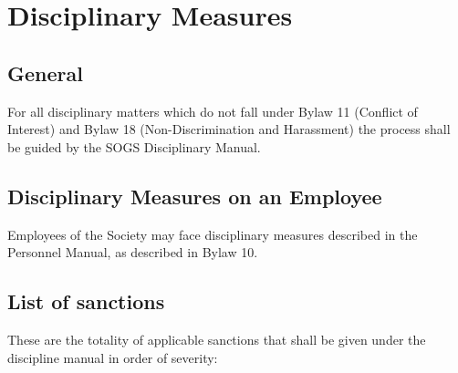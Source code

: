 \section{Disciplinary Measures}
\subsection {General}
\begin{longenum}[ label*=\thesubsection.\arabic*., align=left] 
\item For all disciplinary matters which do not fall under Bylaw 11 (Conflict of Interest) and Bylaw 18 (Non-Discrimination and Harassment) the process shall be guided by the SOGS Disciplinary Manual.
\end{longenum}
\subsection {Disciplinary Measures on an Employee} 
    
\begin{longenum}[ label*=\thesubsection.\arabic*., align=left]  
		\item Employees of the Society may face disciplinary measures described in the Personnel Manual, as described in Bylaw 10.
\end{longenum}
\subsection {List of sanctions} 
These are the totality of applicable sanctions that shall be given under the discipline manual in order of severity:

